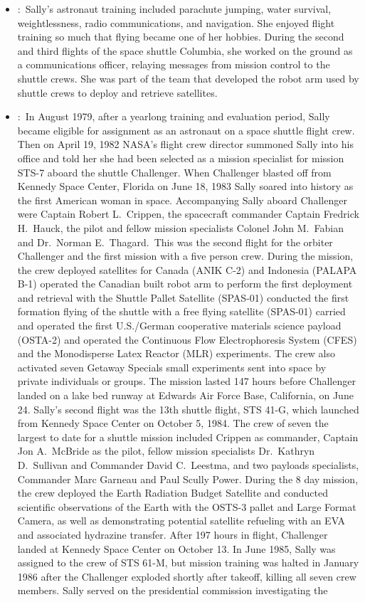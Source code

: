 \documentclass[12pt,a4paper]{article}
\begin{document}
\begin{enumerate}
\begin{itemize}
      \item {}:\ Sally's astronaut training included parachute jumping, water survival, weightlessness, radio communications, and navigation. She enjoyed flight training so much that flying became one of her hobbies. During the second and third flights of the space shuttle Columbia, she worked on the ground as a communications officer, relaying messages from mission control to the shuttle crews. She was part of the team that developed the robot arm used by shuttle crews to deploy and retrieve satellites.
      \item {}:\ In August 1979, after a yearlong training and evaluation period, Sally became eligible for assignment as an astronaut on a space shuttle flight crew. Then on April 19, 1982 NASA's flight crew director summoned Sally into his office and told her she had been selected as a mission specialist for mission STS-7 aboard the shuttle Challenger. When Challenger blasted off from Kennedy Space Center, Florida on June 18, 1983 Sally soared into history as the first American woman in space. Accompanying Sally aboard Challenger were Captain Robert L.\ Crippen, the spacecraft commander Captain Fredrick H.\ Hauck, the pilot and fellow mission specialists Colonel John M.\ Fabian and Dr.\ Norman E.\ Thagard.\ This was the second flight for the orbiter Challenger and the first mission with a five person crew. During the mission, the crew deployed satellites for Canada (ANIK C-2) and Indonesia (PALAPA B-1) operated the Canadian built robot arm to perform the first deployment and retrieval with the Shuttle Pallet Satellite (SPAS-01) conducted the first formation flying of the shuttle with a free flying satellite (SPAS-01) carried and operated the first U.S./German cooperative materials science payload (OSTA-2) and operated the Continuous Flow Electrophoresis System (CFES) and the Monodisperse Latex Reactor (MLR) experiments. The crew also activated seven Getaway Specials small experiments sent into space by private individuals or groups. The mission lasted 147 hours before Challenger landed on a lake bed runway at Edwards Air Force Base, California, on June 24. Sally's second flight was the 13th shuttle flight, STS 41-G, which launched from Kennedy Space Center on October 5, 1984. The crew of seven the largest to date for a shuttle mission included Crippen as commander, Captain Jon A.\ McBride as the pilot, fellow mission specialists Dr.\ Kathryn D.\ Sullivan and Commander David C.\ Leestma, and two payloads specialists, Commander Marc Garneau and Paul Scully Power. During the 8 day mission, the crew deployed the Earth Radiation Budget Satellite and conducted scientific observations of the Earth with the OSTS-3 pallet and Large Format Camera, as well as demonstrating potential satellite refueling with an EVA and associated hydrazine transfer. After 197 hours in flight, Challenger landed at Kennedy Space Center on October 13. In June 1985, Sally was assigned to the crew of STS 61-M, but mission training was halted in January 1986 after the Challenger exploded shortly after takeoff, killing all seven crew members. Sally served on the presidential commission investigating the 
\end{itemize}
\end{enumerate}
\end{document}
